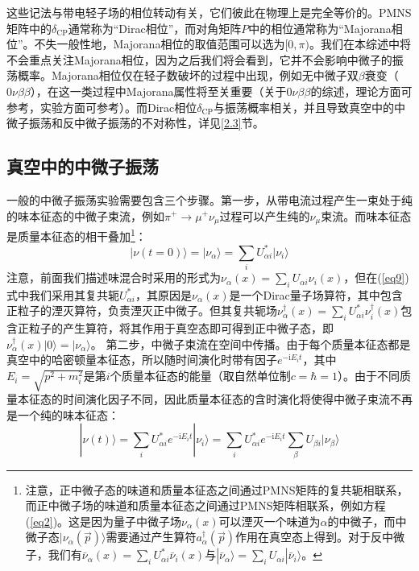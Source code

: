 \documentclass{article}
\newcommand{\ii}{\mathrm{i}}
\begin{document}
	这些记法与带电轻子场的相位转动有关，它们彼此在物理上是完全等价的。PMNS矩阵中的$\delta_\mathrm{CP}$通常称为“Dirac相位”，而对角矩阵$P$中的相位通常称为“Majorana相位”。不失一般性地，Majorana相位的取值范围可以选为$[0,\pi)$。我们在本综述中将不会重点关注Majorana相位，因为之后我们将会看到，它并不会影响中微子的振荡概率。Majorana相位仅在轻子数破坏的过程中出现，例如无中微子双$\beta$衰变（$0\nu\beta\beta$），在这一类过程中Majorana属性将至关重要（关于$0\nu\beta\beta$的综述，理论方面可参考\cite{vergados2012theory}\cite{dell2016neutrinoless}，实验方面可参考\cite{cremonesi2018neutrino}）。而Dirac相位$\delta_\mathrm{CP}$与振荡概率相关，并且导致真空中的中微子振荡和反中微子振荡的不对称性，详见\ref{2.3}节。
	\subsection{真空中的中微子振荡\label{2.2}}
	一般的中微子振荡实验需要包含三个步骤。第一步，从带电流过程产生一束处于纯的味本征态的中微子束流，例如$\pi^+\to\mu^+\nu_\mu$过程可以产生纯的$\nu_\mu$束流。而味本征态是质量本征态的相干叠加\footnote{注意，正中微子态的味道和质量本征态之间通过PMNS矩阵的复共轭相联系，而正中微子场的味道和质量本征态之间通过PMNS矩阵相联系，例如方程(\ref{eq2})。这是因为量子中微子场$\nu_\alpha(x)$可以湮灭一个味道为$\alpha$的中微子，而中微子态$|\nu_\alpha(\vec{p})\rangle$需要通过产生算符$a_\alpha^\dagger(\vec{p})$作用在真空态上得到。对于反中微子，我们有$\bar{\nu}_\alpha(x)=\sum_i U_{\alpha i}^*\bar{\nu}_i(x)$与$|\bar{\nu}_\alpha\rangle=\sum_i U_{\alpha i}|\bar{\nu}_i\rangle$。}：
	\begin{equation}
		|\nu(t=0)\rangle=|\nu_\alpha\rangle=\sum_i U_{\alpha i}^*|\nu_i\rangle
		\label{eq9}
	\end{equation}
	注意，前面我们描述味混合时采用的形式为$\nu_{\alpha}(x)=\sum_iU_{\alpha i}\nu_{i}(x)$，但在(\ref{eq9})式中我们采用其复共轭$U_{\alpha i}^*$，其原因是$\nu_\alpha(x)$是一个Dirac量子场算符，其中包含正粒子的湮灭算符，负责湮灭正中微子。但其复共轭场$\nu_\alpha^\dagger(x)=\sum_i U_{\alpha i}^*\nu_i^\dagger(x)$包含正粒子的产生算符，将其作用于真空态即可得到正中微子态，即$\nu_\alpha^\dagger(x)|0\rangle=|\nu_\alpha\rangle$。
	第二步，中微子束流在空间中传播。由于每个质量本征态都是真空中的哈密顿量本征态，所以随时间演化时带有因子$e^{-\ii E_it}$，其中$E_i=\sqrt{p^2+m_i^2}$是第$i$个质量本征态的能量（取自然单位制$c=\hbar=1$）。由于不同质量本征态的时间演化因子不同，因此质量本征态的含时演化将使得中微子束流不再是一个纯的味本征态：
	\begin{equation}
		|\nu(t)\rangle=\sum_{i} U_{\alpha i}^*e^{-\ii E_it}|\nu_i\rangle=\sum_iU_{\alpha i}^*e^{-\ii E_it}\sum_\beta U_{\beta i}|\nu_\beta\rangle
	\end{equation}
\end{document}
